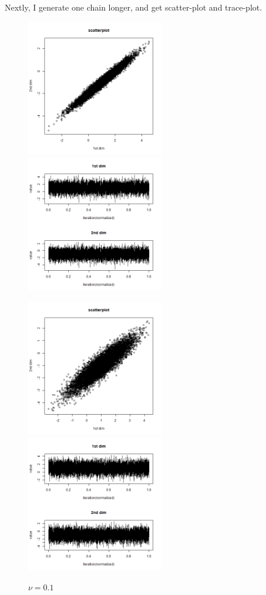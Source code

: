 \documentclass{article}
\begin{document}
\clearpage
Nextly, I generate one chain longer, and get scatter-plot and trace-plot.
\begin{figure}[!h]
    \centering
    \includegraphics[height=6cm]{prob1_test3_oneprocess_scatter.png}
    \includegraphics[height=6cm]{prob1_test3_oneprocess_traceplot.png}
    \caption{$\nu=0.1$}
    \centering
    \includegraphics[height=6cm]{prob1_test2_oneprocess_scatter.png}
    \includegraphics[height=6cm]{prob1_test2_oneprocess_traceplot.png}

\end{figure}
\end{document}
